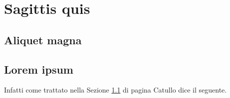 \documentclass[a4paper,12pt]{report}
\begin{document}
\chapter{Sagittis quis} 
\lipsum[1-4]


\section{Aliquet magna} \label{flag}

\lipsum[1]



\section{Lorem ipsum}
\lipsum[1-2]

\medskip

Infatti come trattato nella Sezione \ref{flag} di pagina \pageref{flag} Catullo dice il seguente.

\medskip

\lipsum[1]
\end{document}
